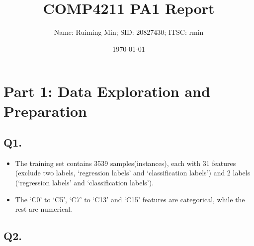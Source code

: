 \documentclass{article}
\title{COMP4211 PA1 Report}
\author{Name: Ruiming Min; SID: 20827430; ITSC: rmin}
\date{\today}
\begin{document}
    
\maketitle

\section*{Part 1: Data Exploration and Preparation}

\subsection*{Q1.}
\begin{itemize}
    \item The training set contains 3539 samples(instances), each with 31 features (exclude two labels, `regression labels' and `classification labels') and 2 labels (`regression labels' and `classification labels').
    \item The `C0' to `C5', `C7' to `C13' and `C15' features are categorical, while the rest are numerical.
\end{itemize}

\subsection*{Q2.}
\end{document}
